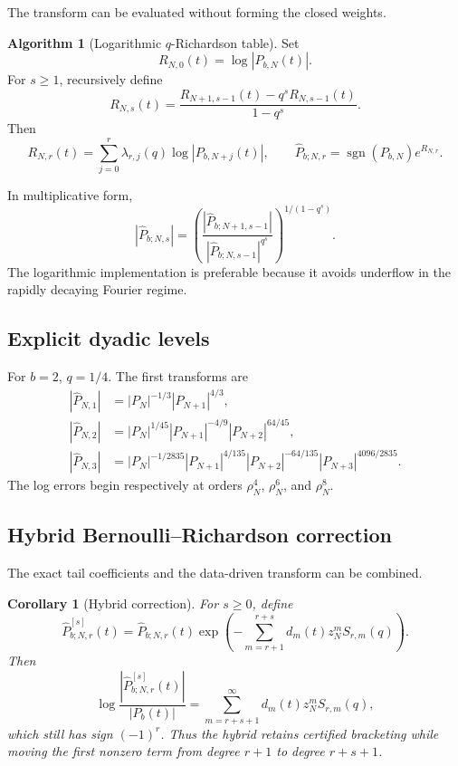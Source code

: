 \documentclass[11pt]{article}
\newtheorem{corollary}[theorem]{Corollary}
\theoremstyle{definition}
\newtheorem{algorithm}[theorem]{Algorithm}
\theoremstyle{remark}
\newcommand{\sgn}{\operatorname{sgn}}
\begin{document}
The transform can be evaluated without forming the closed weights.

\begin{algorithm}[Logarithmic $q$-Richardson table]
\label{alg:rich-table}
Set
\[
R_{N,0}(t)=\log|P_{b,N}(t)|.
\]
For $s\ge1$, recursively define
\begin{equation}
R_{N,s}(t)=
\frac{R_{N+1,s-1}(t)-q^sR_{N,s-1}(t)}{1-q^s}.
\label{eq:rich-recursion}
\end{equation}
Then
\begin{equation}
R_{N,r}(t)=\sum_{j=0}^{r}\lambda_{r,j}(q)
\log|P_{b,N+j}(t)|,
\qquad
\widehat P_{b;N,r}=\sgn(P_{b,N})e^{R_{N,r}}.
\label{eq:rich-table-result}
\end{equation}
\end{algorithm}

In multiplicative form,
\begin{equation}
|\widehat P_{b;N,s}|
=\left(
\frac{|\widehat P_{b;N+1,s-1}|}
{|\widehat P_{b;N,s-1}|^{q^s}}
\right)^{1/(1-q^s)}.
\label{eq:multiplicative-recursion}
\end{equation}
The logarithmic implementation is preferable because it avoids underflow in the rapidly decaying Fourier regime.

\subsection{Explicit dyadic levels}

For $b=2$, $q=1/4$. The first transforms are
\begin{align}
|\widehat P_{N,1}|
&=|P_N|^{-1/3}|P_{N+1}|^{4/3},
\label{eq:r1-dyadic}\\
|\widehat P_{N,2}|
&=|P_N|^{1/45}|P_{N+1}|^{-4/9}|P_{N+2}|^{64/45},
\label{eq:r2-dyadic}\\
|\widehat P_{N,3}|
&=|P_N|^{-1/2835}|P_{N+1}|^{4/135}
|P_{N+2}|^{-64/135}|P_{N+3}|^{4096/2835}.
\label{eq:r3-dyadic}
\end{align}
The log errors begin respectively at orders $\rho_N^4$, $\rho_N^6$, and $\rho_N^8$.

\subsection{Hybrid Bernoulli--Richardson correction}

The exact tail coefficients and the data-driven transform can be combined.

\begin{corollary}[Hybrid correction]
\label{cor:hybrid}
For $s\ge0$, define
\begin{equation}
\widehat P_{b;N,r}^{[s]}(t)
=\widehat P_{b;N,r}(t)
\exp\!\left(-\sum_{m=r+1}^{r+s}
 d_m(t)z_N^mS_{r,m}(q)\right).
\label{eq:hybrid}
\end{equation}
Then
\begin{equation}
\log\frac{|\widehat P_{b;N,r}^{[s]}(t)|}{|P_b(t)|}
=\sum_{m=r+s+1}^{\infty}d_m(t)z_N^mS_{r,m}(q),
\label{eq:hybrid-error}
\end{equation}
which still has sign $(-1)^r$. Thus the hybrid retains certified bracketing while moving the first nonzero term from degree $r+1$ to degree $r+s+1$.
\end{corollary}
\end{document}
